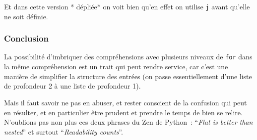     Et dans cette version * dépliée* on voit bien qu'en effet on utilise
\texttt{j} avant qu'elle ne soit définie.

    \hypertarget{conclusion}{%
\subsubsection{Conclusion}\label{conclusion}}

    La possibilité d'imbriquer des compréhensions avec plusieurs niveaux de
\texttt{for} dans la même compréhension est un trait qui peut rendre
service, car c'est une manière de simplifier la structure des entrées
(on passe essentiellement d'une liste de profondeur 2 à une liste de
profondeur 1).

Mais il faut savoir ne pas en abuser, et rester conscient de la
confusion qui peut en résulter, et en particulier être prudent et
prendre le temps de bien se relire. N'oublions pas non plus ces deux
phrases du Zen de Python~: ``\emph{Flat is better than nested}'' et
surtout ``\emph{Readability counts}''.


    
    
    
